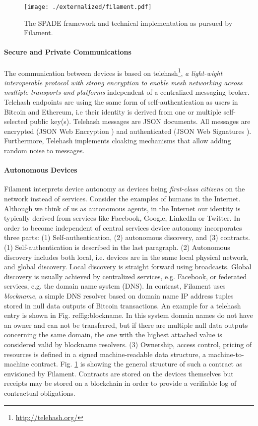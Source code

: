 \begin{figure}
\centering
\texttt{[image: ./externalized/filament.pdf]}
\caption{The SPADE framework and technical implementation as pursued by Filament.}
\label{fig:filament}
\end{figure}


\paragraph{Secure and Private Communications}
The communication between devices is based on telehash\footnote{\url{http://telehash.org/}}, \emph{a light-wight interoperable protocol with strong encryption to enable mesh networking across multiple transports and platforms} independent of a centralized messaging broker.  Telehash endpoints are using the same form of self-authentication as users in Bitcoin and Ethereum, i.e their identity is derived from one or multiple self-selected public key(s). Telehash messages are JSON documents. All messages are encrypted (JSON Web Encryption \cite{rfc7516}) and authenticated (JSON Web Signatures \cite{rfc7515}). Furthermore, Telehash implements cloaking mechanisms that allow adding random noise to messages.

\paragraph{Autonomous Devices}
Filament interprets device autonomy as devices being \emph{first-class citizens} on the network instead of services. Consider the examples of humans in the Internet. Although we think of us as autonomous agents, in the Internet our identity is typically derived from services like Facebook, Google, LinkedIn or Twitter. In order to become independent of central services device autonomy incorporates three parts: (1) Self-authentication, (2) autonomous discovery, and (3) contracts. (1) Self-authentication is described in the last paragraph. (2) Autonomous discovery includes both local, i.e. devices are in the same local physical network, and global discovery.
Local discovery is straight forward using broadcasts. Global discovery is usually achieved by centralized services, e.g. Facebook, or federated services, e.g. the domain name system (DNS). In contrast, Filament uses \emph{blockname}, a simple DNS resolver based on domain name IP address tuples stored in null data outputs of Bitcoin transactions. An example for a telehash entry is shown in Fig. ref{fig:blockname}. In this system domain names do not have an owner and can not be transferred, but if there are multiple null data outputs concerning the same domain, the one with the highest attached value is considered valid by blockname resolvers. (3) Ownership, access control, pricing of resources is defined in a signed machine-readable data structure, a machine-to-machine contract. Fig. \ref{fig:filament} is showing the general structure of such a contract as envisioned by Filament. Contracts are stored on the devices themselves but receipts may be stored on a blockchain in order to provide a verifiable log of contractual obligations.

